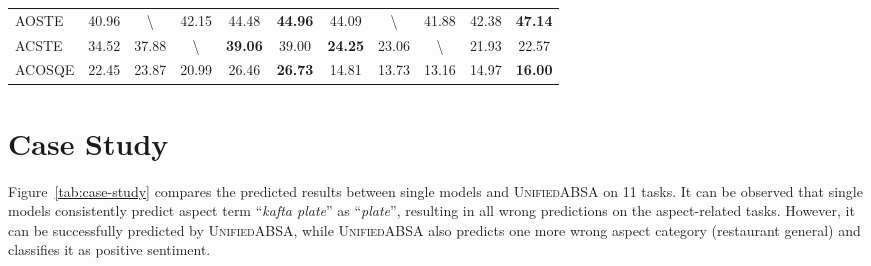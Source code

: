 \documentclass[11pt]{article}
\newcommand{\UnifiedABSA}{\textsc{UnifiedABSA}\xspace}
\begin{document}
\begin{table*}[]
\begin{tabular}{l|ccccc|ccccc}
AOSTE &
  40.96 &
  \textbackslash{} &
  42.15 &
  \multicolumn{1}{c|}{44.48} &
  \textbf{44.96} &
  44.09 &
  \textbackslash{} &
  41.88 &
  \multicolumn{1}{c|}{42.38} &
  \textbf{47.14} \\
ACSTE &
  34.52 &
  37.88 &
  \textbackslash{} &
  \multicolumn{1}{c|}{\textbf{39.06}} &
  39.00 &
  \textbf{24.25} &
  23.06 &
  \textbackslash{} &
  \multicolumn{1}{c|}{21.93} &
  22.57 \\ \midrule
  
ACOSQE &
  22.45 &
  23.87 &
  20.99 &
  \multicolumn{1}{c|}{26.46} &
  \textbf{26.73} &
  14.81 &
  13.73 &
  13.16 &
  \multicolumn{1}{c|}{14.97} &
  \textbf{16.00} \\ 

  
  \bottomrule
\end{tabular}
\caption{Performance comparison between partial tasks for unified training and \textsc{Unified-ABSA} under the 32-shot setting. \emph{aspect}, \emph{cate.}, \emph{opinion}, and \emph{senti.} denotes that we only consider tasks involving aspect, category, opinion, and sentiment in the training. \emph{all} means that all tasks participate in training, i.e., \textsc{unifiedABSA}.}
\label{tab:ablation-on-tasks}
\end{table*} 



\section{Case Study}
Figure~\ref{tab:case-study} compares the predicted results between single models and \UnifiedABSA on 11 tasks. It can be observed that single models consistently predict aspect term ``\emph{kafta plate}'' as ``\emph{plate}'', resulting in all wrong predictions on the aspect-related tasks. However, it can be successfully predicted by \UnifiedABSA, while \UnifiedABSA also predicts one more wrong aspect category (restaurant general) and classifies it as positive sentiment.
\end{document}

